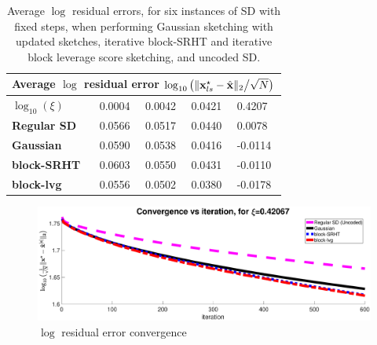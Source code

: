 \documentclass[journal,letterpaper,onecolumn,twoside,nofonttune]{IEEEtran}
\newcommand{\xb}{\bold{x}}
\newcommand{\xbh}{\hat{\xb}}
\begin{document}
\begin{center}
\begin{table}[h]
\centering
\begin{tabular}{ |p{1.6cm}||p{1cm}|p{1cm}|p{1cm}|p{1cm}| }
\hline
\multicolumn{5}{|c|}{\textbf{Average $\log$ residual error $\log_{10}\big(\|\xb_{ls}^{\star}-\xbh\|_2\big/\sqrt{N}\big)$}} \\
\hline
\hline
\textbf{$\log_{10}(\xi)$} & 0.0004 &
0.0042 & 0.0421 & 0.4207 \\
\hline
\hline
\textbf{Regular SD} & 0.0566 & 0.0517 & 0.0440 & 0.0078 \\
\hline
\textbf{Gaussian} & 0.0590 & 0.0538 & 0.0416 & -0.0114 \\
\hline
\textbf{block-SRHT} & 0.0603 & 0.0550 & 0.0431 & -0.0110 \\
\hline
\textbf{block-lvg} & 0.0556 & 0.0502 & 0.0380 & -0.0178 \\
\hline
\end{tabular}
\vspace{3mm}
\caption{Average $\log$ residual errors, for six instances of SD with fixed steps, when performing Gaussian sketching with updated sketches, iterative block-SRHT and iterative block leverage score sketching, and uncoded SD.}
\label{log_res_err_table}
\end{table}
\end{center}
\vspace{-1cm}

\begin{figure}[h]
  \centering
  \includegraphics[scale=.22]{conv_fixed_xi_good--stretch.eps}
  \caption{$\log$ residual error convergence}
  \label{conv_fig_t_distr}
\end{figure}
\end{document}

